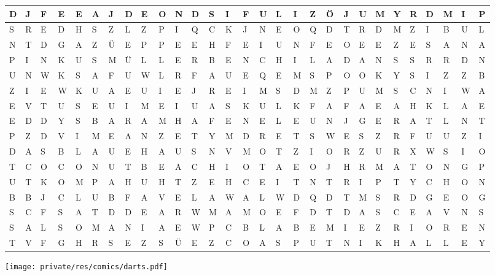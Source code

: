 \begin{center}
\begin{tabular}{| *{29}{>{\centering\arraybackslash}m{1.1em} |}}
		\\ \hline
		D & J & F & E & E & A & J & D & E & O & N & D & S & I & F & U & L & I
			& Z & Ö & J & U & M & Y & R & D & M & I & P
		\\ \hline
		S & R & E & D & H & S & Z & L & Z & P & I & Q & C & K & J & N & E & O
			& Q & D & T & R & D & M & Z & I & B & U & L
		\\ \hline
		N & T & D & G & A & Z & Ü & E & P & P & E & E & H & F & E & I & U & N
			& F & E & O & E & E & Z & E & S & A & N & A
		\\ \hline
		P & I & N & K & U & S & M & Ü & L & L & E & R & B & E & N & C & H & I
			& L & A & D & A & N & S & S & R & R & D & N
		\\ \hline
		U & N & W & K & S & A & F & U & W & L & R & F & A & U & E & Q & E & M
			& S & P & O & O & K & Y & S & I & Z & Z & B
		\\ \hline
		Z & I & E & W & K & U & A & E & U & I & E & J & R & E & I & M & S & D
			& M & Z & P & U & M & S & C & N & I & W & A
		\\ \hline
		E & V & T & U & S & E & U & I & M & E & I & U & A & S & K & U & L & K
			& F & A & F & A & E & A & H & K & L & A & E
		\\ \hline
		E & D & D & Y & S & B & A & R & A & M & H & A & F & E & N & E & L & E
			& U & N & J & G & E & R & A & T & L & N & T
		\\ \hline
		P & Z & D & V & I & M & E & A & N & Z & E & T & Y & M & D & R & E & T
			& S & W & E & S & Z & R & F & U & U & Z & I
		\\ \hline
		D & A & S & B & L & A & U & E & H & A & U & S & N & V & M & O & T & Z
			& I & O & R & Z & U & R & X & W & S & I & O
		\\ \hline
		T & C & O & C & O & N & U & T & B & E & A & C & H & I & O & T & A & E
			& O & J & H & R & M & A & T & O & N & G & P
		\\ \hline
		U & T & K & O & M & P & A & H & U & H & T & Z & E & H & C & E & I & T
			& N & T & R & I & P & T & Y & C & H & O & N
		\\ \hline
		B & B & J & C & L & U & B & F & A & V & E & L & A & W & A & L & W & D
			& Q & D & T & M & S & R & D & G & E & O & G
		\\ \hline
		S & C & F & S & A & T & D & D & E & A & R & W & M & A & M & O & E & F
			& D & T & D & A & S & C & E & A & V & N & S
		\\ \hline
		S & A & L & S & O & M & A & N & I & A & E & W & P & C & B & L & A & B
			& E & M & I & E & Z & R & I & O & R & E & N
		\\ \hline
		T & V & F & G & H & R & S & E & Z & S & Ü & E & Z & C & O & A & S & P
			& U & T & N & I & K & H & A & L & L & E & Y
		\\ \hline
	\end{tabular}
	
	\texttt{[image: private/res/comics/darts.pdf]}
\end{center}

